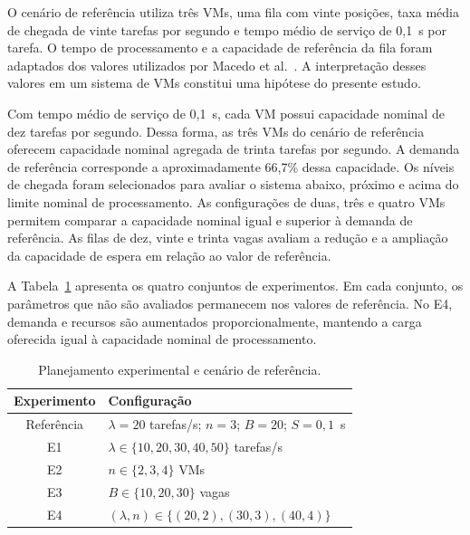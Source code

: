 \documentclass[conference]{IEEEtran}
\begin{document}
O cenário de referência utiliza três VMs, uma fila com
vinte posições, taxa média de chegada de vinte tarefas
por segundo e tempo médio de serviço de 0,1~s por tarefa.
O tempo de processamento e a capacidade de referência
da fila foram adaptados dos valores utilizados por
Macedo et al.~\cite{macedo2022vanets}. A interpretação
desses valores em um sistema de VMs constitui uma
hipótese do presente estudo.

Com tempo médio de serviço de 0,1~s, cada VM possui
capacidade nominal de dez tarefas por segundo. Dessa
forma, as três VMs do cenário de referência oferecem
capacidade nominal agregada de trinta tarefas por segundo.
A demanda de referência corresponde a aproximadamente
66,7\% dessa capacidade. Os níveis de chegada foram
selecionados para avaliar o sistema abaixo, próximo e
acima do limite nominal de processamento.
As configurações de duas, três e quatro VMs permitem
comparar a capacidade nominal igual e superior à demanda
de referência. As filas de dez, vinte e trinta vagas
avaliam a redução e a ampliação da capacidade de espera
em relação ao valor de referência.

A Tabela~\ref{tab:experimentos} apresenta os quatro
conjuntos de experimentos. Em cada conjunto, os
parâmetros que não são avaliados permanecem nos valores
de referência. No E4, demanda e recursos são aumentados
proporcionalmente, mantendo a carga oferecida igual
à capacidade nominal de processamento.

\begin{table}[!t]
    \caption{Planejamento experimental e cenário de referência.}
    \label{tab:experimentos}
    \centering
    \footnotesize
    \renewcommand{\arraystretch}{1.2}
    \begin{tabular}{c p{}}
        \hline
        \textbf{Experimento} & \textbf{Configuração} \\
        \hline
        Referência &
        $\lambda=20$ tarefas/s; $n=3$; $B=20$;
        $S=0,1$~s \\

        E1 &
        $\lambda \in \{10,20,30,40,50\}$ tarefas/s \\

        E2 &
        $n \in \{2,3,4\}$ VMs \\

        E3 &
        $B \in \{10,20,30\}$ vagas \\

        E4 &
        $(\lambda,n)\in\{(20,2),(30,3),(40,4)\}$ \\
        \hline
    \end{tabular}
\end{table}
\end{document}
